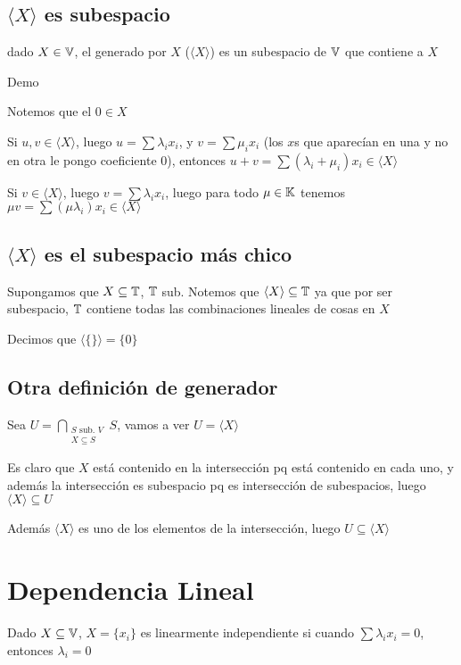 \documentclass{article}
\begin{document}
\subsection{$\langle X \rangle$ es subespacio}
dado $X \in \mathbb{V}$, el generado por $X$ ($\langle X \rangle$) es un subespacio de $\mathbb{V}$ que contiene a $X$

Demo

Notemos que el $0 \in X$

Si $u, v \in \langle X \rangle$, luego $u = \sum \lambda_ix_i$, y
$v = \sum \mu_ix_i$ (los $x$s que aparecían en una y no en otra le pongo coeficiente $0$),
entonces $u + v = \sum (\lambda_i + \mu_i)x_i \in \langle X\rangle$

Si $v \in \langle X \rangle$, luego $v = \sum \lambda_i x_i$, luego para todo $\mu \in \mathbb{K}$
tenemos $\mu v = \sum (\mu\lambda_i) x_i \in \langle X \rangle$

\subsection{$\langle X \rangle$ es el subespacio más chico}
Supongamos que $X \subseteq \mathbb{T}$, $\mathbb{T}$ sub. Notemos que
$\langle X \rangle \subseteq \mathbb{T}$ ya que por ser subespacio, $\mathbb{T}$
contiene todas las combinaciones lineales de cosas en $X$

Decimos que $\langle\{\}\rangle = \{0\}$

\subsection{Otra definición de generador}
Sea 
$U = \bigcap_{
	\begin{matrix}
		S \text{ sub. } V \\
		X \subseteq S
	\end{matrix}
} S$, vamos a ver $U = \langle X\rangle$

Es claro que $X$ está contenido en la intersección pq está contenido en cada uno,
y además la intersección es subespacio pq es intersección de subespacios, luego $\langle X \rangle \subseteq U$

Además $\langle X \rangle$ es uno de los elementos de la intersección, luego
$U \subseteq \langle X\rangle$
\section{Dependencia Lineal}
Dado $X \subseteq \mathbb{V}$, $X = \{x_i\}$ es linearmente independiente si cuando
$\sum \lambda_i x_i = 0$, entonces $\lambda_i = 0$
\end{document}
